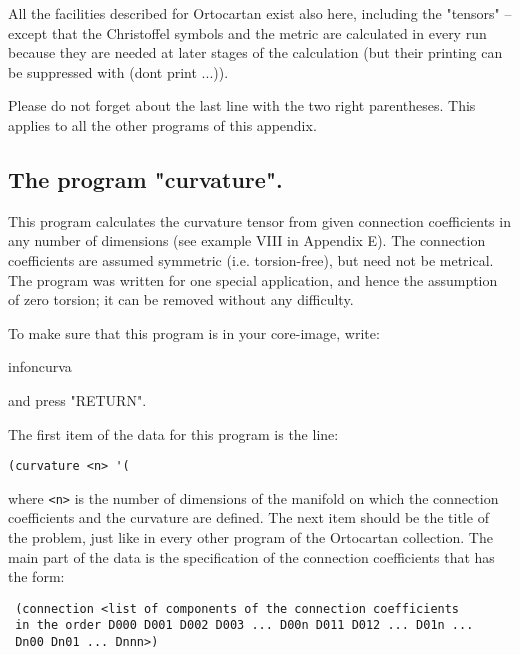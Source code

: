 All the facilities described for Ortocartan exist also here, including the
"tensors" -- except that the Christoffel symbols and the metric are calculated
in every run because they are needed at later stages of the calculation (but
their printing can be suppressed with (dont print ...)).

Please do not forget about the last line with the two right parentheses. This
applies to all the other programs of this appendix.

\subsection{The program "curvature".}

This program calculates the curvature tensor from given connection coefficients
in any number of dimensions (see example VIII in Appendix E). The connection
coefficients are assumed symmetric (i.e. torsion-free), but need not be
metrical. The program was written for one special application, and hence the
assumption of zero torsion; it can be removed without any difficulty.

To make sure that this program is in your core-image, write:

\bigskip

infoncurva

\bigskip

\noindent and press "RETURN".

The first item of the data for this program is the line:

\bigskip

\begin{verbatim}
(curvature <n> '(
\end{verbatim}

\bigskip

\noindent where \verb+<n>+ is the number of dimensions of the manifold on which
the connection coefficients and the curvature are defined. The next item should
be the title of the problem, just like in every other program of the Ortocartan
collection. The main part of the data is the specification of the connection
coefficients that has the form:

\bigskip

\begin{verbatim}
 (connection <list of components of the connection coefficients
 in the order D000 D001 D002 D003 ... D00n D011 D012 ... D01n ...
 Dn00 Dn01 ... Dnnn>)
\end{verbatim}

\bigskip

